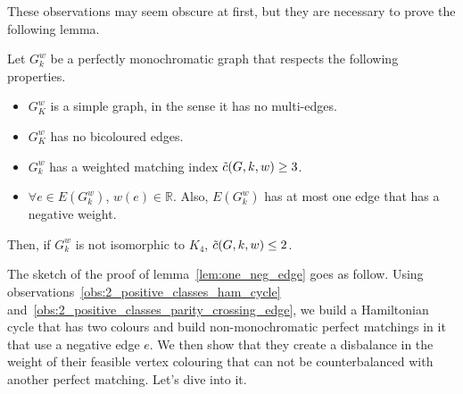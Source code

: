 These observations may seem obscure at first, but they are necessary to prove the following lemma.

\begin{lemma}
    \label{lem:one_neg_edge}
    Let $G_k^w$ be a perfectly monochromatic graph that respects the following properties.
    \begin{itemize}
        \item $G_K^w$ is a simple graph, in the sense it has no multi-edges.
        \item $G_K^w$ has no bicoloured edges.
        \item $G_k^w$ has a weighted matching index $\Tilde{c}(G, k, w) \geq 3$.
        \item $\forall e \in E(G_k^w)$, $w(e) \in \mathbb{R}$.
        Also, $E(G_k^w)$ has at most one edge that has a negative weight.
    \end{itemize}
    Then, if $G_k^w$ is not isomorphic to $K_4$, $\Tilde{c}(G, k, w) \leq 2$.
\end{lemma}

The sketch of the proof of lemma~\ref{lem:one_neg_edge} goes as follow.
Using observations~\ref{obs:2_positive_classes_ham_cycle} and~\ref{obs:2_positive_classes_parity_crossing_edge}, we build a Hamiltonian cycle that has two colours and build non-monochromatic perfect matchings in it that use a negative edge $e$.
We then show that they create a disbalance in the weight of their feasible vertex colouring that can not be counterbalanced with another perfect matching.
Let's dive into it.

